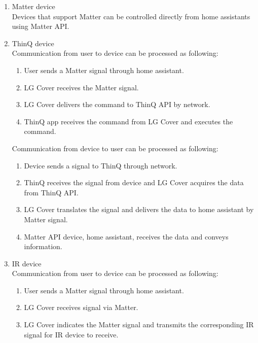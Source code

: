 \documentclass[conference]{IEEEtran}
\begin{document}
\begin{enumerate}[label=\arabic*.]
\item {\large{Matter device}}\\
Devices that support Matter can be controlled directly from home assistants using Matter API.\\

\item {\large{ThinQ device}}\\
Communication from user to device can be processed as following:\\
\begin{enumerate}[label=\alph*.]
\item User sends a Matter signal through home assistant.\\
\item LG Cover receives the Matter signal.\\
\item LG Cover delivers the command to ThinQ API by network.\\
\item ThinQ app receives the command from LG Cover and executes the command.\\
\end{enumerate}
Communication from device to user can be processed as following:\\
\begin{enumerate}[label=\alph*.]
\item Device sends a signal to ThinQ through network.\\
\item ThinQ receives the signal from device and LG Cover acquires the data from ThinQ API.\\
\item LG Cover translates the signal and delivers the data to home assistant by Matter signal.\\
\item Matter API device, home assistant, receives the data and conveys information.\\
\end{enumerate}

\item {\large{IR device}}\\
Communication from user to device can be processed as following:\\
\begin{enumerate}[label=\alph*.]
\item User sends a Matter signal through home assistant.\\
\item LG Cover receives signal via Matter.\\
\item LG Cover indicates the Matter signal and transmits the corresponding IR signal for IR device to receive.\\
\end{enumerate}
\end{enumerate}
\end{document}
